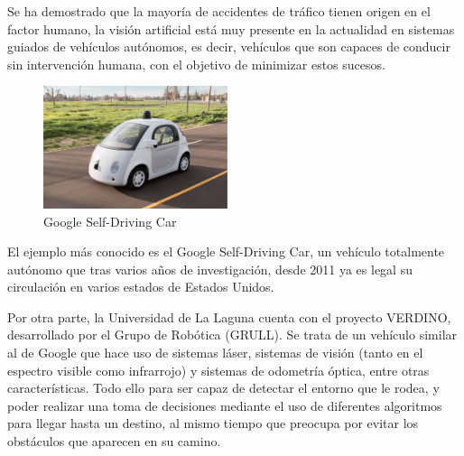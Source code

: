 

Se ha demostrado que la mayoría de accidentes de tráfico tienen origen en el
factor humano, la visión artificial está muy presente en la actualidad en
sistemas guiados de vehículos autónomos, es decir, vehículos que son capaces de
conducir sin intervención humana, con el objetivo de minimizar estos sucesos.

\begin{figure}
  \vspace{-20pt}
  \begin{center}
    \includegraphics[width=0.48\textwidth]{images/cap1/GoogleSelf-DrivingCar.eps}
  \end{center}
  \vspace{-20pt}
  \caption{Google Self-Driving Car}
  \vspace{-10pt}
  \label{fig:GoogleSelf-DrivingCar}
\end{figure}

El ejemplo más conocido es el Google Self-Driving Car, un
vehículo totalmente autónomo que tras varios años de investigación, desde 2011
ya es legal su circulación en varios estados de Estados Unidos.

Por otra parte, la Universidad de La Laguna cuenta con el proyecto VERDINO,
desarrollado por el Grupo de Robótica (GRULL). Se trata de un vehículo similar
al de Google que hace uso de sistemas láser, sistemas de visión (tanto en el
espectro visible como infrarrojo) y sistemas de odometría óptica, entre otras
características. Todo ello para ser capaz de detectar el entorno que le rodea,
y poder realizar una toma de decisiones mediante el uso de diferentes algoritmos
para llegar hasta un destino, al mismo tiempo que preocupa por evitar los
obstáculos que aparecen en su camino.

